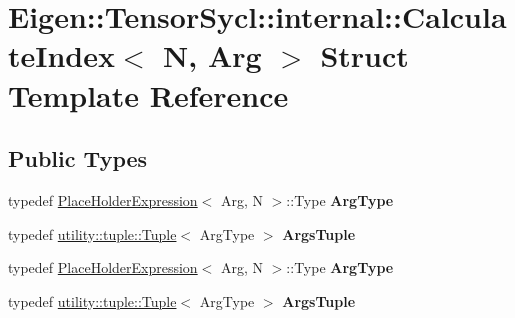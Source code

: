 \hypertarget{struct_eigen_1_1_tensor_sycl_1_1internal_1_1_calculate_index_3_01_n_00_01_arg_01_4}{}\section{Eigen\+:\+:Tensor\+Sycl\+:\+:internal\+:\+:Calculate\+Index$<$ N, Arg $>$ Struct Template Reference}
\label{struct_eigen_1_1_tensor_sycl_1_1internal_1_1_calculate_index_3_01_n_00_01_arg_01_4}
\subsection*{Public Types}
\begin{DoxyCompactItemize}
\item 
\mbox{\label{struct_eigen_1_1_tensor_sycl_1_1internal_1_1_calculate_index_3_01_n_00_01_arg_01_4_abb9a9cc321ebdd151276a5dcc5fbf5f0}} 
typedef \hyperlink{struct_eigen_1_1_tensor_sycl_1_1internal_1_1_place_holder_expression}{Place\+Holder\+Expression}$<$ Arg, N $>$\+::Type {\bfseries Arg\+Type}
\item 
\mbox{\label{struct_eigen_1_1_tensor_sycl_1_1internal_1_1_calculate_index_3_01_n_00_01_arg_01_4_aaaba075aec8facfab2ca89d28b6e2fd1}} 
typedef \hyperlink{structutility_1_1tuple_1_1_tuple}{utility\+::tuple\+::\+Tuple}$<$ Arg\+Type $>$ {\bfseries Args\+Tuple}
\item 
\mbox{\label{struct_eigen_1_1_tensor_sycl_1_1internal_1_1_calculate_index_3_01_n_00_01_arg_01_4_abb9a9cc321ebdd151276a5dcc5fbf5f0}} 
typedef \hyperlink{struct_eigen_1_1_tensor_sycl_1_1internal_1_1_place_holder_expression}{Place\+Holder\+Expression}$<$ Arg, N $>$\+::Type {\bfseries Arg\+Type}
\item 
\mbox{\label{struct_eigen_1_1_tensor_sycl_1_1internal_1_1_calculate_index_3_01_n_00_01_arg_01_4_aaaba075aec8facfab2ca89d28b6e2fd1}} 
typedef \hyperlink{structutility_1_1tuple_1_1_tuple}{utility\+::tuple\+::\+Tuple}$<$ Arg\+Type $>$ {\bfseries Args\+Tuple}
\end{DoxyCompactItemize}


